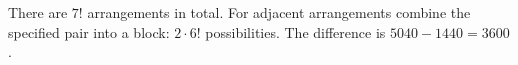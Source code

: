 There are $7!$ arrangements in total. For adjacent arrangements combine the specified pair into a block: $2\cdot6!$ possibilities. The difference is $5040-1440=\boxed{3600}$.
